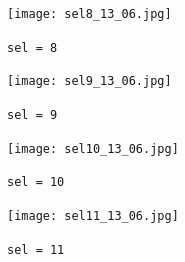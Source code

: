 \documentclass{scrartcl}
\begin{document}
\begin{figure}[H]
  \centering
  \begin{minipage}{0.45\linewidth}
    \centering
    \texttt{[image: sel8\_13\_06.jpg]}
    \caption{\texttt{sel = 8}}
  \end{minipage}\quad
  \begin{minipage}{0.45\linewidth}
    \centering
    \texttt{[image: sel9\_13\_06.jpg]}
    \caption{\texttt{sel = 9}}
  \end{minipage}
\end{figure}
\begin{figure}[H]
  \centering
  \begin{minipage}{0.45\linewidth}
    \centering
    \texttt{[image: sel10\_13\_06.jpg]}
    \caption{\texttt{sel = 10}}
  \end{minipage}\quad
  \begin{minipage}{0.45\linewidth}
    \centering
    \texttt{[image: sel11\_13\_06.jpg]}
    \caption{\texttt{sel = 11}}
  \end{minipage}
\end{figure}
\end{document}

